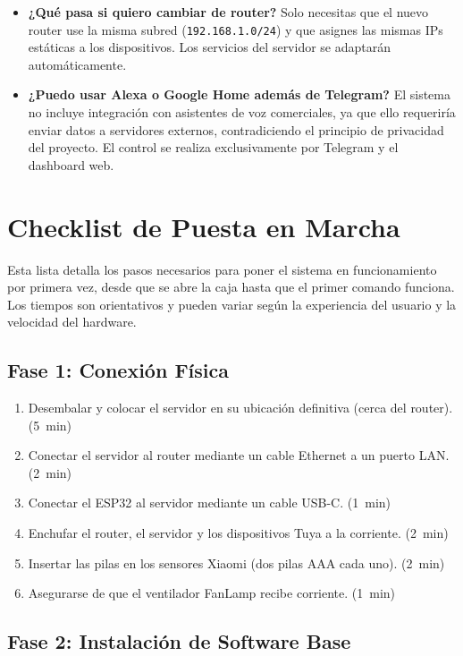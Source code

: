 \begin{itemize}
    \item \textbf{¿Qué pasa si quiero cambiar de router?} Solo necesitas que el nuevo router use la misma subred (\texttt{192.168.1.0/24}) y que asignes las mismas IPs estáticas a los dispositivos. Los servicios del servidor se adaptarán automáticamente.

    \item \textbf{¿Puedo usar Alexa o Google Home además de Telegram?} El sistema no incluye integración con asistentes de voz comerciales, ya que ello requeriría enviar datos a servidores externos, contradiciendo el principio de privacidad del proyecto. El control se realiza exclusivamente por Telegram y el dashboard web.
\end{itemize}

\section{Checklist de Puesta en Marcha}

Esta lista detalla los pasos necesarios para poner el sistema en funcionamiento por primera vez, desde que se abre la caja hasta que el primer comando funciona. Los tiempos son orientativos y pueden variar según la experiencia del usuario y la velocidad del hardware.

\subsection{Fase 1: Conexión Física}

\begin{enumerate}
    \item Desembalar y colocar el servidor en su ubicación definitiva (cerca del router). \hfill (5~min)
    \item Conectar el servidor al router mediante un cable Ethernet a un puerto LAN. \hfill (2~min)
    \item Conectar el ESP32 al servidor mediante un cable USB-C. \hfill (1~min)
    \item Enchufar el router, el servidor y los dispositivos Tuya a la corriente. \hfill (2~min)
    \item Insertar las pilas en los sensores Xiaomi (dos pilas AAA cada uno). \hfill (2~min)
    \item Asegurarse de que el ventilador FanLamp recibe corriente. \hfill (1~min)
\end{enumerate}

\subsection{Fase 2: Instalación de Software Base}

